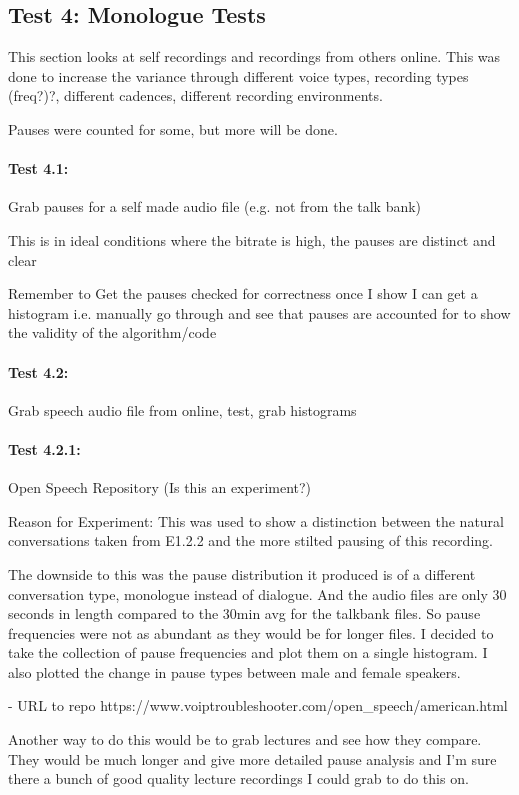 \subsection{Test 4: Monologue Tests}
This section looks at self recordings and recordings from others online. This was done to increase the variance through different voice types, recording types (freq?)?, different cadences, different recording environments. 

Pauses were counted for some, but more will be done.

\paragraph{Test 4.1:} Grab pauses for a self made audio file (e.g. not from the talk bank)

This is in ideal conditions where the bitrate is high, the pauses are distinct and clear

Remember to Get the pauses checked for correctness once I show I can get a histogram i.e. manually go through and see that pauses are accounted for to show the validity of the algorithm/code 

\paragraph{Test 4.2:} Grab speech audio file from online, test, grab histograms 

\paragraph{Test 4.2.1:} Open Speech Repository (Is this an experiment?)

Reason for Experiment: This was used to show a distinction between the natural conversations taken from E1.2.2 and the more stilted pausing of this recording. 

The downside to this was the pause distribution it produced is of a different conversation type, monologue instead of dialogue. And the audio files are only 30 seconds in length compared to the 30min avg for the talkbank files. So pause frequencies were not as abundant as they would be for longer files. I decided to take the collection of pause frequencies and plot them on a single histogram. I also plotted the change in pause types between male and female speakers. 

- URL to repo
https://www.voiptroubleshooter.com/open\_speech/american.html

Another way to do this would be to grab lectures and see how they compare. They would be much longer and give more detailed pause analysis and I'm sure there a bunch of good quality lecture recordings I could grab to do this on. 

